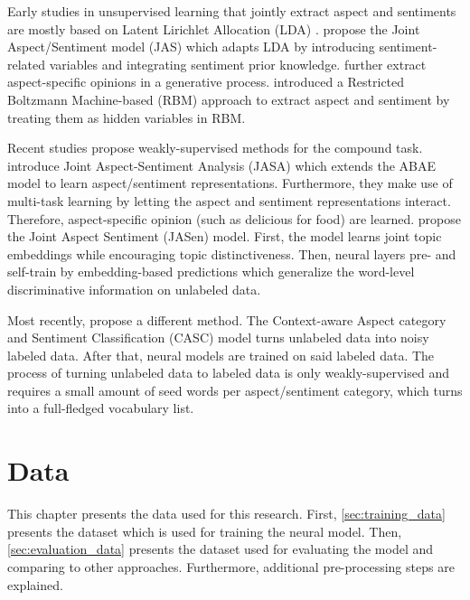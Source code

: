 \documentclass[american, oneside]{ecsgdp}
\begin{document}
Early studies in unsupervised learning that jointly extract aspect and sentiments are mostly based on Latent Lirichlet Allocation (LDA) \parencite{Blei2003LDA}. \textcite{Xu2012JAS} propose the Joint Aspect/Sentiment model (JAS) which adapts LDA by introducing sentiment-related variables and integrating sentiment prior knowledge. \textcite{Zhao2010MaxEnt-LDA} further extract aspect-specific opinions in a generative process. \textcite{Wang2015Boltzmann} introduced a Restricted Boltzmann Machine-based (RBM) approach to extract aspect and sentiment by treating them as hidden variables in RBM.

Recent studies propose weakly-supervised methods for the compound task.
\textcite{Zhuang2020JASA} introduce Joint Aspect-Sentiment Analysis (JASA) which extends the ABAE model to learn aspect/sentiment representations. Furthermore, they make use of multi-task learning by letting the aspect and sentiment representations interact. Therefore, aspect-specific opinion (such as delicious for food) are learned. \textcite{Huang2020JASen} propose the Joint Aspect Sentiment (JASen) model. First, the model learns joint topic embeddings while encouraging topic distinctiveness. Then, neural layers pre- and self-train by embedding-based predictions which generalize the word-level discriminative information on unlabeled data. 

Most recently, \textcite{Kumar2021CASC} propose a different method. The Context-aware Aspect category and Sentiment Classification (CASC) model turns unlabeled data into noisy labeled data. After that, neural models are trained on said labeled data. The process of turning unlabeled data to labeled data is only weakly-supervised and requires a small amount of seed words per aspect/sentiment category, which turns into a full-fledged vocabulary list. 

\chapter{Data} \label{chap:data}
This chapter presents the data used for this research. First, \cref{sec:training_data} presents the dataset which is used for training the neural model. Then, \cref{sec:evaluation_data} presents the dataset used for evaluating the model and comparing to other approaches. Furthermore, additional pre-processing steps are explained. 
\end{document}
